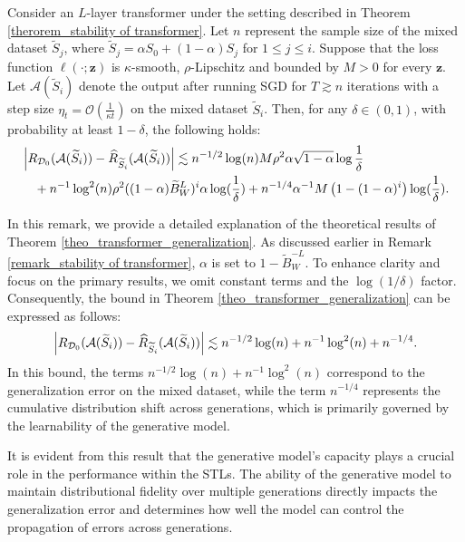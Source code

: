 \begin{theorem}\label{theo_transformer_generalization}
Consider an $L$-layer transformer under the setting described in Theorem \ref{therorem_stability of transformer}. Let $n$ represent the sample size of the mixed dataset $\widetilde{S}_j$, where $\widetilde{S}_j=\alpha S_0+(1-\alpha) S_j$ for $1 \leq j \leq i$. Suppose that the loss function $\ell(\cdot ; \boldsymbol{z})$ is $\kappa$-smooth, $\rho$-Lipschitz and bounded by $M>0$ for every $\boldsymbol{z}$. Let $\mathcal{A}(\widetilde{S}_i)$ denote the output after running SGD for $T\gtrsim n$ iterations with a step size $\eta_t=\mathcal{O}(\frac{1}{\kappa t})$ on the mixed dataset $\widetilde{S}_i$. Then, for any $\delta \in(0,1)$, with probability at least $1-\delta$, the following holds:
\begin{align}
    &\left|R_{\mathcal{D}_0}(\mathcal{A}(\widetilde{S}_i))-\widehat{R}_{\widetilde{S}_i}(\mathcal{A}(\widetilde{S}_i))\right|\lesssim n^{-1/2}\log (n) M\rho^2 \alpha \sqrt{1-\alpha}\log \frac{1}{\delta}\notag\\
    &\quad+n^{-1}\log^2(n)\rho^2((1-\alpha)\widetilde{B}_W^L)^i \alpha  \log (\frac{1}{\delta}) +n^{-1/4}\alpha^{-1} M\left(1-(1-\alpha)^i\right) \log (\frac{1}{\delta}).
\end{align}
\end{theorem}
\begin{remark}
    In this remark, we provide a detailed explanation of the theoretical results of Theorem \ref{theo_transformer_generalization}. As discussed earlier in Remark \ref{remark_stability of transformer}, $\alpha$ is set to $1-\widetilde{B}_{W}^{-L}$. To enhance clarity and focus on the primary results, we omit constant terms and the $\log (1 / \delta)$ factor. Consequently, the bound in Theorem \ref{theo_transformer_generalization} can be expressed as follows:
 \begin{align}
\left|R_{\mathcal{D}_0}(\mathcal{A}(\widetilde{S}_i))-\widehat{R}_{\widetilde{S}_i}(\mathcal{A}(\widetilde{S}_i))\right| \lesssim n^{-1 / 2} \log (n)+n^{-1} \log ^2(n)+n^{-1 / 4}. \notag
\end{align}
In this bound, the terms $n^{-1 / 2} \log (n)+n^{-1} \log ^2(n)$ correspond to the generalization error on the mixed dataset, while the term $n^{-1 / 4}$ represents the cumulative distribution shift across generations, which is primarily governed by the learnability of the generative model.

It is evident from this result that the generative model's capacity plays a crucial role in the performance within the STLs. The ability of the generative model to maintain distributional fidelity over multiple generations directly impacts the generalization error and determines how well the model can control the propagation of errors across generations.
\end{remark}








